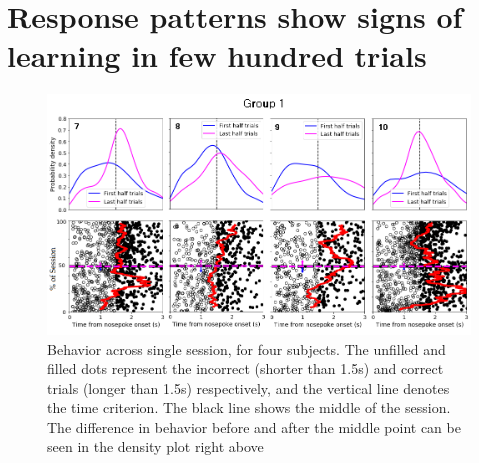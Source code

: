 \section{Response patterns show signs of learning in few hundred trials}

    \begin{figure}
        \centering
        \includegraphics[width=\textwidth]{figures/grupo1.png}
        \caption[Behavior across single session]{Behavior across single session, for four subjects. The unfilled and filled dots represent the incorrect (shorter than 1.5s) and correct trials (longer than 1.5s) respectively, and the vertical line denotes the time criterion. The black line shows the middle of the session. The difference in behavior before and after the middle point can be seen in the density plot right above}
        \label{fig:behavior}
    \end{figure} 
    
